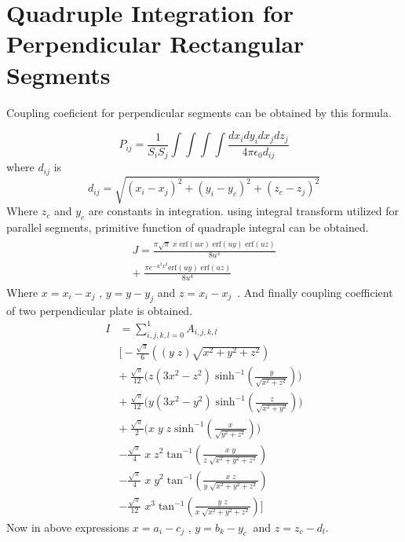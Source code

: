 \documentclass[final,5p,times,twocolumn]{elsarticle}
\begin{document}
\section{Quadruple Integration for Perpendicular Rectangular Segments}
Coupling coeficient for perpendicular segments can be obtained by this formula.

\begin{equation}
\label {eq21}
P_{ij} = \frac 1 {S_i S_j}\int \int \int \int \frac{dx_i dy_i dx_j dz_j}{4 \pi \epsilon_0 d_{ij}}
\end{equation} 
where $d _{ij}$ is 
\begin{equation}
\label {eq22}
d_{ij} = \sqrt{(x_i-x_j)^2 + (y_i-y_c)^2 + (z_c - z_j)^2}
\end{equation} 
Where $z_c$ and $y_c$ are constants in integration. using integral transform utilized for parallel segments, primitive function of quadraple integral can be obtained.
\begin{eqnarray}
\label {eq23}
\begin{array}{lll}

J = \frac{\pi\sqrt{\pi}\;x\; \mathrm {erf}(u x)\; \mathrm {erf}(u y)\; \mathrm {erf}(u z)}{8u^3}\\
+\; \frac{\pi e^{-u^2 x^2} \mathrm{erf}(u y)\; \mathrm{erf}(u z)}{8u^4}
\end{array}
\end{eqnarray}
Where $x = x_i - x_j$ , $y = y - y_j$ and $z = x_i - x_j$\ .
And finally coupling coefficient of two perpendicular plate is obtained.
\begin{equation}\label {eq:24}
\begin{array}{ll}
I& = \sum_{i,j,k,l=0}^1 A_{i,j,k,l}\\
&  \bigg[ -\frac {\sqrt{\pi} } {6} \left((y\; z)\sqrt{x^2 + y^2 + z^2} \right) \\

& +\  \frac {\sqrt{\pi} } {12} \bigg( z(3x^2 - z^2)\;\mathrm{sinh^{-1}}(\frac{y}{\sqrt{x^2 + z^2}}) \bigg)\\
& +\  \frac {\sqrt{\pi} } {12} \bigg( y(3x^2 - y^2)\;\mathrm{sinh^{-1}}(\frac{z}{\sqrt{x^2 + y^2}}) \bigg)\\
& +\  \frac {\sqrt{\pi} } {2} \bigg( x\; y\; z\;\mathrm{sinh^{-1}}(\frac{x}{\sqrt{y^2 + z^2}}) \bigg)\\
&-  \frac {\sqrt{\pi} } {4}\;x \;z^2\;\mathrm{tan^{-1}}(\frac{x\;y}{z\;\sqrt{x^2+y^2 + z^2}})\\

&-  \frac {\sqrt{\pi} } {4}\;x \;y^2\;\mathrm{tan^{-1}}(\frac{x\;z}{y\;\sqrt{x^2+y^2 + z^2}})\\
&-  \frac {\sqrt{\pi} } {12}\;x^3\;\mathrm{tan^{-1}}(\frac{y\;z}{x\;\sqrt{x^2+y^2 + z^2}})\bigg]


\end{array}
\end{equation}
Now in above expressions $x = a_i - c_j$ , $y = b_k - y_c\ $ and $z = z_c - d_l$.
\end{document}
